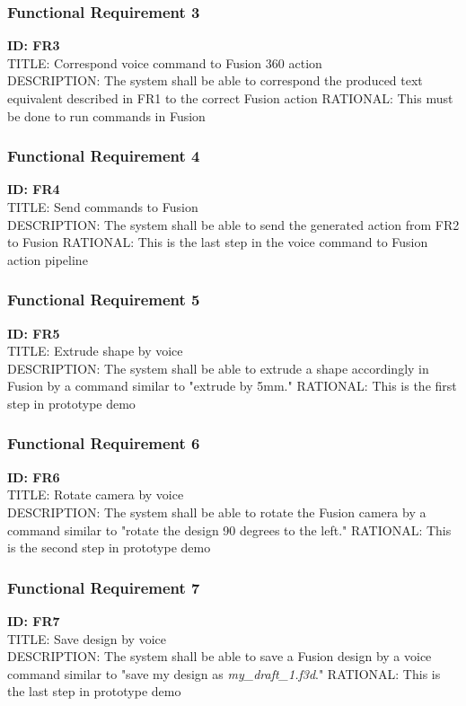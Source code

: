 \documentclass[onecolumn, draftclsnofoot,10pt, compsoc]{IEEEtran}
\begin{document}
        \subsubsection{Functional Requirement 3}
    	\textbf{ID: FR3} \\
        TITLE: Correspond voice command to Fusion 360 action  \\
        DESCRIPTION: The system shall be able to correspond the produced text equivalent described in FR1 to the correct Fusion action
        RATIONAL: This must be done to run commands in Fusion \\
        
        \subsubsection{Functional Requirement 4}
    	\textbf{ID: FR4} \\
        TITLE: Send commands to Fusion  \\
        DESCRIPTION: The system shall be able to send the generated action from FR2 to Fusion
        RATIONAL: This is the last step in the voice command to Fusion action pipeline \\
        
        \subsubsection{Functional Requirement 5}
    	\textbf{ID: FR5} \\
        TITLE: Extrude shape by voice \\
        DESCRIPTION: The system shall be able to extrude a shape accordingly in Fusion by a command similar to "extrude by 5mm."
        RATIONAL: This is the first step in prototype demo \\
        
        \subsubsection{Functional Requirement 6}
    	\textbf{ID: FR6} \\
        TITLE: Rotate camera by voice \\
        DESCRIPTION: The system shall be able to rotate the Fusion camera by a command similar to "rotate the design 90 degrees to the left." 
        RATIONAL: This is the second step in prototype demo \\
        
        \subsubsection{Functional Requirement 7}
    	\textbf{ID: FR7} \\
        TITLE: Save design by voice \\
        DESCRIPTION: The system shall be able to save a Fusion design by a voice command similar to "save my design as \textit{my\_draft\_1.f3d}."
        RATIONAL: This is the last step in prototype demo \\
        
\end{document}
